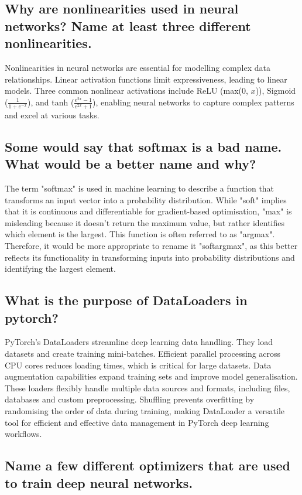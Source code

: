 \documentclass{article}
\begin{document}
\subsection{Why are nonlinearities used in neural networks? Name at least three different nonlinearities.}

Nonlinearities in neural networks are essential for modelling complex data relationships.
Linear activation functions limit expressiveness, leading to linear models.
Three common nonlinear activations include ReLU (max(0, $x$)), Sigmoid ($\tfrac{1}{1 + e^{-x}}$), and tanh ($\tfrac{e^{2x}-1}{e^{2x}+1}$), enabling neural networks to capture complex patterns and excel at various tasks.


\subsection{Some would say that softmax is a bad name. What would be a better name and why?}

The term "softmax" is used in machine learning to describe a function that transforms an input vector into a probability distribution.
While "soft" implies that it is continuous and differentiable for gradient-based optimisation, "max" is misleading because it doesn't return the maximum value, but rather identifies which element is the largest.
This function is often referred to as "argmax".
Therefore, it would be more appropriate to rename it "softargmax", as this better reflects its functionality in transforming inputs into probability distributions and identifying the largest element.


\subsection{What is the purpose of DataLoaders in pytorch?}

PyTorch's DataLoaders streamline deep learning data handling.
They load datasets and create training mini-batches.
Efficient parallel processing across CPU cores reduces loading times, which is critical for large datasets.
Data augmentation capabilities expand training sets and improve model generalisation.
These loaders flexibly handle multiple data sources and formats, including files, databases and custom preprocessing.
Shuffling prevents overfitting by randomising the order of data during training, making DataLoader a versatile tool for efficient and effective data management in PyTorch deep learning workflows.


\subsection{Name a few different optimizers that are used to train deep neural networks.}
\end{document}

